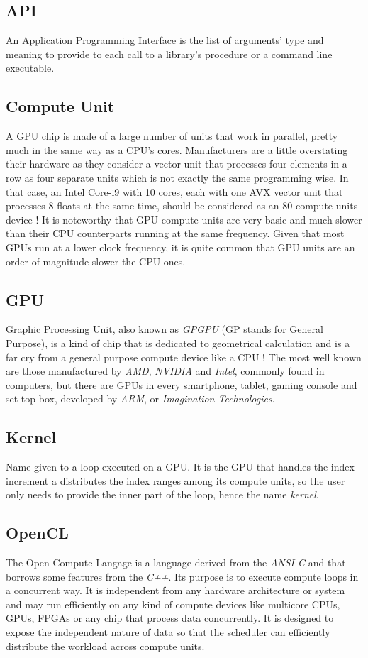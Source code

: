 \documentclass[a4paper,12pt]{article}
\begin{document}
\subsection{API}
An Application Programming Interface is the list of arguments' type and meaning to provide to each call to a library's procedure or a command line executable.

\subsection{Compute Unit}
A GPU chip is made of a large number of units that work in parallel, pretty much in the same way as a CPU's cores. Manufacturers are a little overstating their hardware as they consider a vector unit that processes four elements in a row as four separate units which is not exactly the same programming wise. In that case, an Intel Core-i9 with 10 cores, each with one AVX vector unit that processes 8 floats at the same time, should be considered as an 80 compute units device ! It is noteworthy that GPU compute units are very basic and much slower than their CPU counterparts running at the same frequency. Given that most GPUs run at a lower clock frequency, it is quite common that GPU units are an order of magnitude slower the CPU ones.

\subsection{GPU}
Graphic Processing Unit, also known as \emph{GPGPU} (GP stands for General Purpose), is a kind of chip that is dedicated to geometrical calculation and is a far cry from a general purpose compute device like a CPU ! The most well known are those manufactured by \emph{AMD}, \emph{NVIDIA} and \emph{Intel}, commonly found in computers, but there are GPUs in every smartphone, tablet, gaming console and set-top box, developed by \emph{ARM}, or \emph{Imagination Technologies}.

\subsection{Kernel}
Name given to a loop executed on a GPU. It is the GPU that handles the index increment a distributes the index ranges among its compute units, so the user only needs to provide the inner part of the loop, hence the name \emph{kernel}.

\subsection{OpenCL}
The Open Compute Langage is a language derived from the \emph{ANSI C} and that borrows some features from the \emph{C++}. Its purpose is to execute compute loops in a concurrent way. It is independent from any hardware architecture or system and may run efficiently on any kind of compute devices like multicore CPUs, GPUs, FPGAs or any chip that process data concurrently. It is designed to expose the independent nature of data so that the scheduler can efficiently distribute the workload across compute units.
\end{document}
